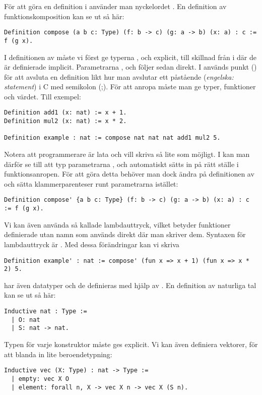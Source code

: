 För att göra en definition i \coq{} använder man nyckelordet . En
definition av funktionskomposition kan se ut så här:
\begin{lstlisting}
Definition compose (a b c: Type) (f: b -> c) (g: a -> b) (x: a) : c := f (g x).
\end{lstlisting}
I definitionen av  måste vi först ge typerna ,  och 
explicit, till skillnad från i \haskell{} där de är definierade implicit.
Parametrarna ,  och  följer sedan direkt. I \coq{} används punkt
() för att avsluta en definition likt hur man avslutar ett påstående
(\emph{engelska: statement}) i C med semikolon (;). För att anropa 
måste man ge typer, funktioner och värdet. Till exempel:
\begin{lstlisting}
Definition add1 (x: nat) := x + 1.
Definition mul2 (x: nat) := x * 2.

Definition example : nat := compose nat nat nat add1 mul2 5.
\end{lstlisting}
Notera att programmerare är lata och vill skriva så lite som möjligt. I
\coq{} kan man därför se till att typ parametrarna ,  och 
automatiskt sätts in på rätt ställe i funktionsanropen. För att göra detta
behöver man dock ändra på definitionen av  och sätta
klammerparenteser runt parametrarna istället:
\begin{lstlisting}
Definition compose' {a b c: Type} (f: b -> c) (g: a -> b) (x: a) : c := f (g x).
\end{lstlisting}
Vi kan även använda så kallade lambdauttryck, vilket betyder funktioner
definierade utan namn som används direkt där man skriver dem. Syntaxen för
lambdauttryck är . Med dessa förändringar kan
vi skriva
\begin{lstlisting}
Definition example' : nat := compose' (fun x => x + 1) (fun x => x * 2) 5.
\end{lstlisting}
\coq{} har även datatyper och de definieras med hjälp av . En
definition av naturliga tal kan se ut så här:
\begin{lstlisting}
Inductive nat : Type :=
  | O: nat
  | S: nat -> nat.
\end{lstlisting}
Typen för varje konstruktor måste ges explicit. Vi kan även definiera vektorer, för
att blanda in lite beroendetypning:
\begin{lstlisting}
Inductive vec (X: Type) : nat -> Type :=
  | empty: vec X O
  | element: forall n, X -> vec X n -> vec X (S n).
\end{lstlisting}
